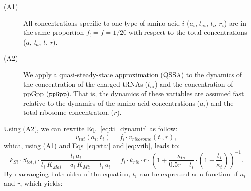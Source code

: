 \documentclass[a4paper,12pt]{article}
\newcommand{\tr}[1]{{#1}}
\begin{document}
\begin{description}
\item[(A1)] All concentrations specific to one type of amino acid $i$ ($a_i$, $t_{ai}$, $t_{i}$, $r_i$) are in the same proportion $f_i = f = 1/20$ with respect to the total concentrations ($a$, $t_{a}$, $t$, $r$).
\item[(A2)] We apply a quasi-steady-state approximation (QSSA) to the dynamics of the concentration of the charged tRNAs ($t_{ai}$) and the concentration of ppGpp ($\texttt{ppGpp}$).
That is, the dynamics of these variables are assumed fast relative to the dynamics of the amino acid concentrations ($a_i$) and the total ribosome concentration ($r$).
\end{description}
\tr{Using (A2), we can rewrite Eq.~\ref{eq:ti_dynamic} as follow:
\begin{equation}\label{eq:vtai_vrib}
v_{tai}(a_i, t_{i}) = f_i \cdot v_{ribosome}(t_i,r),
\end{equation}
which, using (A1) and Eqs~\ref{eq:vtai} and \ref{eq:vrib}, leads to:
\begin{equation}
\label{eq:vtai_vrib_without_sum}
k_{Si} \cdot S_{tot,i} \cdot \frac{t_i\, a_i}{t_i\, K_{Mai} + a_i\, K_{Mti} + t_i\, a_i}
= f_i \cdot k_{rib} \cdot r \cdot
  \left(1 + \frac{\kappa_{ta}}{0.5 r - t_i} \cdot \left( 1 + \frac{t_i}{\kappa_t} \right)  \right)^{-1}.
\end{equation}
By rearranging both sides of the equation, $t_i$ can be expressed as a function of $a_i$ and $r$, which yields:}
\end{document}

